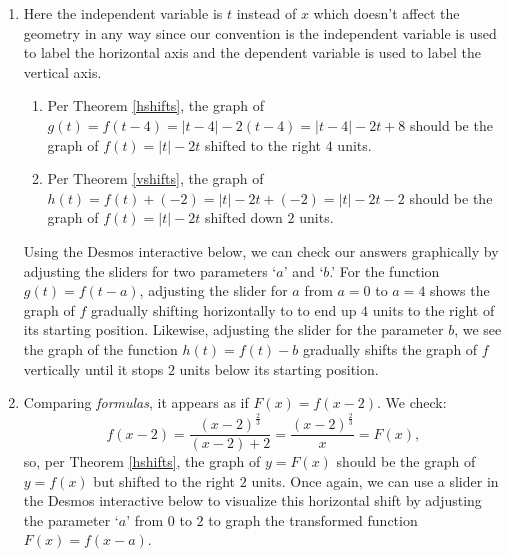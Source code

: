 \documentclass{ximera}
\begin{document}
\begin{example}
\begin{enumerate}
\begin{enumerate}
 \end{enumerate}
 
 \item  Here the independent variable is $t$ instead of $x$ which doesn't affect the geometry in any way since our convention is the independent variable is used to label the horizontal axis and the dependent variable is used to label the vertical axis.  
 
 \begin{enumerate}
 
 \item  Per Theorem \ref{hshifts}, the graph of $g(t) = f(t-4) = |t-4|-2(t-4) = |t-4|-2t+8$ should be the graph of $f(t) = |t|-2t$ shifted to the right $4$ units.
  
 \item Per Theorem \ref{vshifts},  the graph of $h(t) = f(t)+(-2) = |t|-2t+(-2) = |t|-2t-2$ should be the graph of  $f(t) = |t|-2t$ shifted down $2$ units. 
 
  \end{enumerate}

  Using the Desmos interactive below, we can check our answers graphically by adjusting the sliders for two parameters `$a$' and `$b$.'  For the function $g(t) = f(t-a)$, adjusting the slider for $a$ from $a=0$ to $a=4$ shows the graph of $f$ gradually shifting horizontally to to end up $4$ units to the right of its starting position.  Likewise, adjusting the slider for the parameter $b$, we see the graph of the function $h(t) = f(t) - b$ gradually shifts the graph of $f$ vertically until it stops $2$ units below its starting position.
 

\begin{center}
\end{center}

\item  Comparing \textit{formulas}, it appears as if $F(x) = f(x-2)$.  We check: \[ f(x-2) = \dfrac{(x-2)^{\frac{2}{3}}}{(x-2)+2} = \dfrac{(x-2)^{\frac{2}{3}}}{x} = F(x),\]  so, per Theorem \ref{hshifts},  the graph of $y = F(x)$ should be the graph of $y=f(x)$ but shifted to the right $2$ units. Once again, we can use a slider in the Desmos interactive below to visualize this horizontal shift by adjusting the parameter `$a$' from $0$ to $2$ to graph the transformed function $F(x) = f(x-a)$.

\begin{center}
\end{center}


\end{enumerate}
\end{example}
\end{document}
